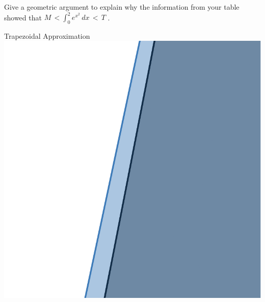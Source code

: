 \documentclass[letterpaper,12pt]{article}
\theoremstyle{definition}
\begin{document}
\begin{large}

 Give a geometric argument to explain why the information from your table showed that $M\, <  \int_{0}^{2} e^{x^2} \, dx\, <\, T$ .

\end{large}

\vspace{1cm}

\begin{minipage}{0.45\textwidth}
 \begin{center}
  Trapezoidal Approximation
  \vskip 16pt
  \includegraphics[scale=0.25]{trapezoid.png}
 \end{center}
\end{minipage}
\hfill
\end{document}
